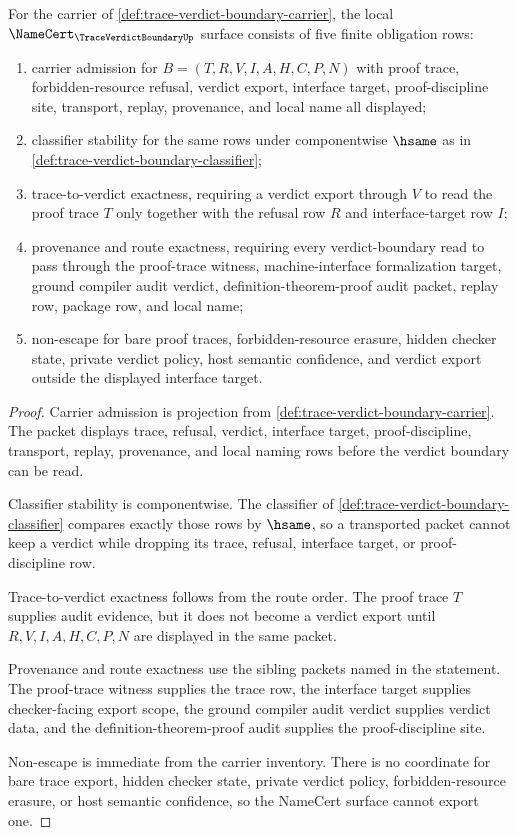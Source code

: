 \begin{theorem}
\label{thm:trace-verdict-boundary-namecert-obligations}
For the carrier of \autoref{def:trace-verdict-boundary-carrier}, the local $\NameCert_{\TraceVerdictBoundaryUp}$ surface consists of five finite obligation rows:
\begin{enumerate}
\item carrier admission for $B=(T,R,V,I,A,H,C,P,N)$ with proof trace, forbidden-resource refusal, verdict export, interface target, proof-discipline site, transport, replay, provenance, and local name all displayed;
\item classifier stability for the same rows under componentwise $\hsame$ as in \autoref{def:trace-verdict-boundary-classifier};
\item trace-to-verdict exactness, requiring a verdict export through $V$ to read the proof trace $T$ only together with the refusal row $R$ and interface-target row $I$;
\item provenance and route exactness, requiring every verdict-boundary read to pass through the proof-trace witness, machine-interface formalization target, ground compiler audit verdict, definition-theorem-proof audit packet, replay row, package row, and local name;
\item non-escape for bare proof traces, forbidden-resource erasure, hidden checker state, private verdict policy, host semantic confidence, and verdict export outside the displayed interface target.
\end{enumerate}
\end{theorem}
\begin{proof}
Carrier admission is projection from \autoref{def:trace-verdict-boundary-carrier}. The packet displays trace, refusal, verdict, interface target, proof-discipline, transport, replay, provenance, and local naming rows before the verdict boundary can be read.

Classifier stability is componentwise. The classifier of \autoref{def:trace-verdict-boundary-classifier} compares exactly those rows by $\hsame$, so a transported packet cannot keep a verdict while dropping its trace, refusal, interface target, or proof-discipline row.

Trace-to-verdict exactness follows from the route order. The proof trace $T$ supplies audit evidence, but it does not become a verdict export until $R,V,I,A,H,C,P,N$ are displayed in the same packet.

Provenance and route exactness use the sibling packets named in the statement. The proof-trace witness supplies the trace row, the interface target supplies checker-facing export scope, the ground compiler audit verdict supplies verdict data, and the definition-theorem-proof audit supplies the proof-discipline site.

Non-escape is immediate from the carrier inventory. There is no coordinate for bare trace export, hidden checker state, private verdict policy, forbidden-resource erasure, or host semantic confidence, so the NameCert surface cannot export one.
\end{proof}

